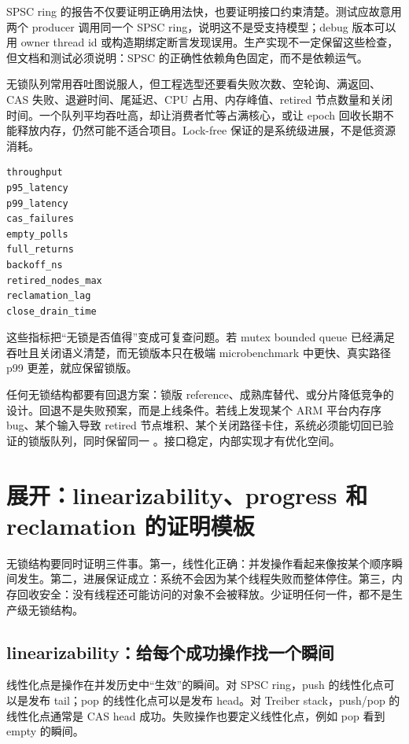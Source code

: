 SPSC ring 的报告不仅要证明正确用法快，也要证明接口约束清楚。测试应故意用两个 producer 调用同一个 SPSC ring，说明这不是受支持模型；debug 版本可以用 owner thread id 或构造期绑定断言发现误用。生产实现不一定保留这些检查，但文档和测试必须说明：SPSC 的正确性依赖角色固定，而不是依赖运气。

无锁队列常用吞吐图说服人，但工程选型还要看失败次数、空轮询、满返回、CAS 失败、退避时间、尾延迟、CPU 占用、内存峰值、retired 节点数量和关闭时间。一个队列平均吞吐高，却让消费者忙等占满核心，或让 epoch 回收长期不能释放内存，仍然可能不适合项目。Lock-free 保证的是系统级进展，不是低资源消耗。

\begin{lstlisting}[numbers=none,caption={LockFreeLifecycleReport 的指标扩展}]
throughput
p95_latency
p99_latency
cas_failures
empty_polls
full_returns
backoff_ns
retired_nodes_max
reclamation_lag
close_drain_time
\end{lstlisting}

这些指标把“无锁是否值得”变成可复查问题。若 mutex bounded queue 已经满足吞吐且关闭语义清楚，而无锁版本只在极端 microbenchmark 中更快、真实路径 p99 更差，就应保留锁版。

任何无锁结构都要有回退方案：锁版 reference、成熟库替代、或分片降低竞争的设计。回退不是失败预案，而是上线条件。若线上发现某个 ARM 平台内存序 bug、某个输入导致 retired 节点堆积、某个关闭路径卡住，系统必须能切回已验证的锁版队列，同时保留同一 。接口稳定，内部实现才有优化空间。

\section{展开：linearizability、progress 和 reclamation 的证明模板}

无锁结构要同时证明三件事。第一，线性化正确：并发操作看起来像按某个顺序瞬间发生。第二，进展保证成立：系统不会因为某个线程失败而整体停住。第三，内存回收安全：没有线程还可能访问的对象不会被释放。少证明任何一件，都不是生产级无锁结构。

\subsection{linearizability：给每个成功操作找一个瞬间}

线性化点是操作在并发历史中“生效”的瞬间。对 SPSC ring，push 的线性化点可以是发布 tail；pop 的线性化点可以是发布 head。对 Treiber stack，push/pop 的线性化点通常是 CAS head 成功。失败操作也要定义线性化点，例如 pop 看到 empty 的瞬间。

